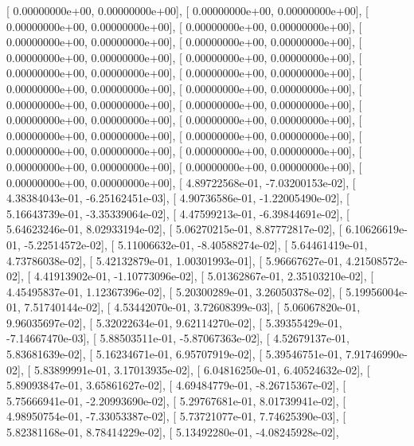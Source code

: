 \documentclass{article}
\begin{document}
       [  0.00000000e+00,   0.00000000e+00],
       [  0.00000000e+00,   0.00000000e+00],
       [  0.00000000e+00,   0.00000000e+00],
       [  0.00000000e+00,   0.00000000e+00],
       [  0.00000000e+00,   0.00000000e+00],
       [  0.00000000e+00,   0.00000000e+00],
       [  0.00000000e+00,   0.00000000e+00],
       [  0.00000000e+00,   0.00000000e+00],
       [  0.00000000e+00,   0.00000000e+00],
       [  0.00000000e+00,   0.00000000e+00],
       [  0.00000000e+00,   0.00000000e+00],
       [  0.00000000e+00,   0.00000000e+00],
       [  0.00000000e+00,   0.00000000e+00],
       [  0.00000000e+00,   0.00000000e+00],
       [  0.00000000e+00,   0.00000000e+00],
       [  0.00000000e+00,   0.00000000e+00],
       [  0.00000000e+00,   0.00000000e+00],
       [  0.00000000e+00,   0.00000000e+00],
       [  0.00000000e+00,   0.00000000e+00],
       [  0.00000000e+00,   0.00000000e+00],
       [  0.00000000e+00,   0.00000000e+00],
       [  0.00000000e+00,   0.00000000e+00],
       [  0.00000000e+00,   0.00000000e+00],
       [  4.89722568e-01,  -7.03200153e-02],
       [  4.38384043e-01,  -6.25162451e-03],
       [  4.90736586e-01,  -1.22005490e-02],
       [  5.16643739e-01,  -3.35339064e-02],
       [  4.47599213e-01,  -6.39844691e-02],
       [  5.64623246e-01,   8.02933194e-02],
       [  5.06270215e-01,   8.87772817e-02],
       [  6.10626619e-01,  -5.22514572e-02],
       [  5.11006632e-01,  -8.40588274e-02],
       [  5.64461419e-01,   4.73786038e-02],
       [  5.42132879e-01,   1.00301993e-01],
       [  5.96667627e-01,   4.21508572e-02],
       [  4.41913902e-01,  -1.10773096e-02],
       [  5.01362867e-01,   2.35103210e-02],
       [  4.45495837e-01,   1.12367396e-02],
       [  5.20300289e-01,   3.26050378e-02],
       [  5.19956004e-01,   7.51740144e-02],
       [  4.53442070e-01,   3.72608399e-03],
       [  5.06067820e-01,   9.96035697e-02],
       [  5.32022634e-01,   9.62114270e-02],
       [  5.39355429e-01,  -7.14667470e-03],
       [  5.88503511e-01,  -5.87067363e-02],
       [  4.52679137e-01,   5.83681639e-02],
       [  5.16234671e-01,   6.95707919e-02],
       [  5.39546751e-01,   7.91746990e-02],
       [  5.83899991e-01,   3.17013935e-02],
       [  6.04816250e-01,   6.40524632e-02],
       [  5.89093847e-01,   3.65861627e-02],
       [  4.69484779e-01,  -8.26715367e-02],
       [  5.75666941e-01,  -2.20993690e-02],
       [  5.29767681e-01,   8.01739941e-02],
       [  4.98950754e-01,  -7.33053387e-02],
       [  5.73721077e-01,   7.74625390e-03],
       [  5.82381168e-01,   8.78414229e-02],
       [  5.13492280e-01,  -4.08245928e-02],
\end{document}
